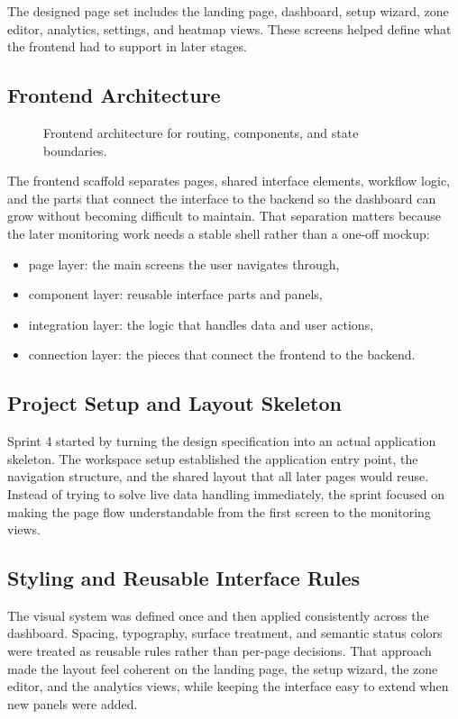 The designed page set includes the landing page, dashboard, setup wizard, zone editor, analytics, settings, and heatmap views. These screens helped define what the frontend had to support in later stages.

\subsection{Frontend Architecture}
\begin{figure}[H]
    \centering
    \caption{Frontend architecture for routing, components, and state boundaries.}
    \label{fig:sprint4_frontend_arch}
\end{figure}

The frontend scaffold separates pages, shared interface elements, workflow logic, and the parts that connect the interface to the backend so the dashboard can grow without becoming difficult to maintain. That separation matters because the later monitoring work needs a stable shell rather than a one-off mockup:
\begin{itemize}
    \item page layer: the main screens the user navigates through,
    \item component layer: reusable interface parts and panels,
    \item integration layer: the logic that handles data and user actions,
    \item connection layer: the pieces that connect the frontend to the backend.
\end{itemize}

\subsection{Project Setup and Layout Skeleton}
Sprint 4 started by turning the design specification into an actual application skeleton. The workspace setup established the application entry point, the navigation structure, and the shared layout that all later pages would reuse. Instead of trying to solve live data handling immediately, the sprint focused on making the page flow understandable from the first screen to the monitoring views.

\subsection{Styling and Reusable Interface Rules}
The visual system was defined once and then applied consistently across the dashboard. Spacing, typography, surface treatment, and semantic status colors were treated as reusable rules rather than per-page decisions. That approach made the layout feel coherent on the landing page, the setup wizard, the zone editor, and the analytics views, while keeping the interface easy to extend when new panels were added.

